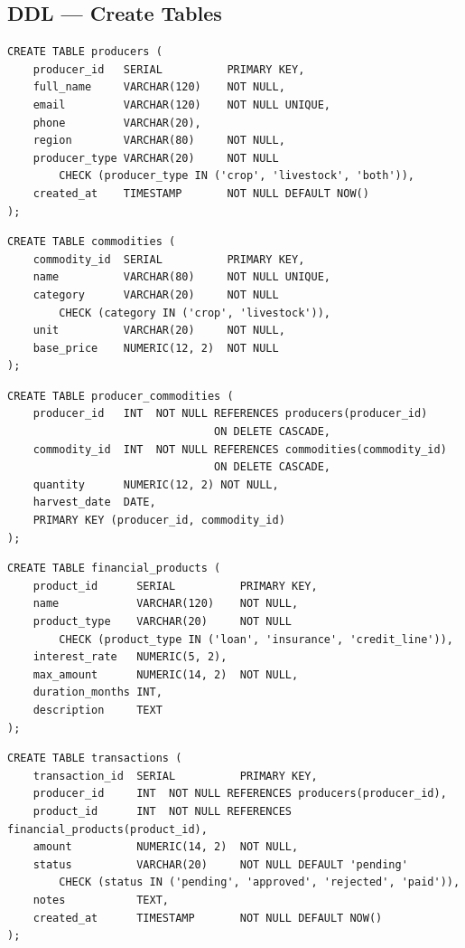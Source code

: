 \documentclass[12pt, a4paper]{article}
\begin{document}
\subsection{DDL — Create Tables}

\begin{lstlisting}[style=sqlstyle, caption={DDL: producers table}]
CREATE TABLE producers (
    producer_id   SERIAL          PRIMARY KEY,
    full_name     VARCHAR(120)    NOT NULL,
    email         VARCHAR(120)    NOT NULL UNIQUE,
    phone         VARCHAR(20),
    region        VARCHAR(80)     NOT NULL,
    producer_type VARCHAR(20)     NOT NULL
        CHECK (producer_type IN ('crop', 'livestock', 'both')),
    created_at    TIMESTAMP       NOT NULL DEFAULT NOW()
);
\end{lstlisting}

\begin{lstlisting}[style=sqlstyle, caption={DDL: commodities table}]
CREATE TABLE commodities (
    commodity_id  SERIAL          PRIMARY KEY,
    name          VARCHAR(80)     NOT NULL UNIQUE,
    category      VARCHAR(20)     NOT NULL
        CHECK (category IN ('crop', 'livestock')),
    unit          VARCHAR(20)     NOT NULL,
    base_price    NUMERIC(12, 2)  NOT NULL
);
\end{lstlisting}

\begin{lstlisting}[style=sqlstyle, caption={DDL: producer\_commodities junction table}]
CREATE TABLE producer_commodities (
    producer_id   INT  NOT NULL REFERENCES producers(producer_id)
                                ON DELETE CASCADE,
    commodity_id  INT  NOT NULL REFERENCES commodities(commodity_id)
                                ON DELETE CASCADE,
    quantity      NUMERIC(12, 2) NOT NULL,
    harvest_date  DATE,
    PRIMARY KEY (producer_id, commodity_id)
);
\end{lstlisting}

\begin{lstlisting}[style=sqlstyle, caption={DDL: financial\_products table}]
CREATE TABLE financial_products (
    product_id      SERIAL          PRIMARY KEY,
    name            VARCHAR(120)    NOT NULL,
    product_type    VARCHAR(20)     NOT NULL
        CHECK (product_type IN ('loan', 'insurance', 'credit_line')),
    interest_rate   NUMERIC(5, 2),
    max_amount      NUMERIC(14, 2)  NOT NULL,
    duration_months INT,
    description     TEXT
);
\end{lstlisting}

\begin{lstlisting}[style=sqlstyle, caption={DDL: transactions table}]
CREATE TABLE transactions (
    transaction_id  SERIAL          PRIMARY KEY,
    producer_id     INT  NOT NULL REFERENCES producers(producer_id),
    product_id      INT  NOT NULL REFERENCES financial_products(product_id),
    amount          NUMERIC(14, 2)  NOT NULL,
    status          VARCHAR(20)     NOT NULL DEFAULT 'pending'
        CHECK (status IN ('pending', 'approved', 'rejected', 'paid')),
    notes           TEXT,
    created_at      TIMESTAMP       NOT NULL DEFAULT NOW()
);
\end{lstlisting}
\end{document}
